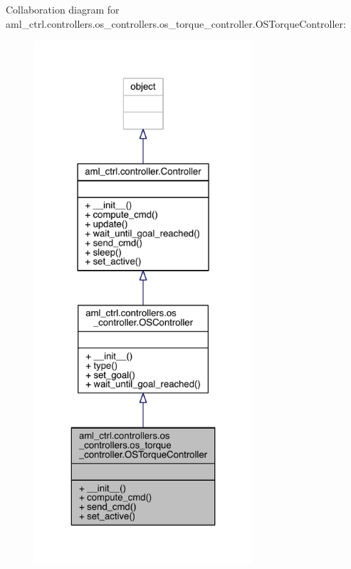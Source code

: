 Collaboration diagram for aml\+\_\+ctrl.\+controllers.\+os\+\_\+controllers.\+os\+\_\+torque\+\_\+controller.\+O\+S\+Torque\+Controller\+:\nopagebreak
\begin{figure}[H]
\begin{center}
\leavevmode
\includegraphics[height=550pt]{classaml__ctrl_1_1controllers_1_1os__controllers_1_1os__torque__controller_1_1_o_s_torque_controller__coll__graph}
\end{center}
\end{figure}
